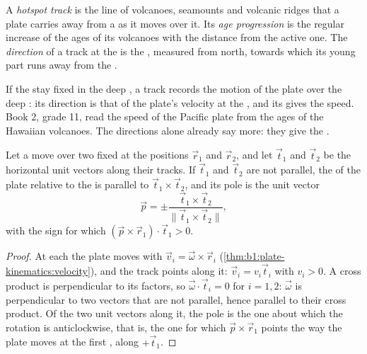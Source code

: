 \begin{definition}\label{def:b1:hotspots:track}
A \emph{hotspot track} is the line of volcanoes, seamounts
and volcanic ridges that a plate carries away from a  as it moves over
it. Its \emph{age progression} is the regular increase
of the ages of its volcanoes with the distance from the active one. The
\emph{direction} of a track at the  is the , measured from north,
towards which its young part runs away from the .
\end{definition}

If the  stay fixed in the deep , a track records the motion of the
plate over the deep : its direction is that of the plate's velocity at
the , and its  gives the speed. Book 2, grade 11, read the
speed of the Pacific plate from the ages of the Hawaiian volcanoes. The
directions alone already say more: they give the .

\begin{proposition}\label{prop:b1:hotspots:two-tracks}
Let a  move over two fixed  at the positions $\vec r_1$ and
$\vec r_2$, and let $\vec t_1$ and $\vec t_2$ be the horizontal unit vectors
along their tracks. If $\vec t_1$ and $\vec t_2$ are not parallel, the  of the plate relative to the  is parallel to
$\vec t_1\times\vec t_2$, and its pole is the unit vector
\[
  \vec p = \pm\frac{\vec t_1\times\vec t_2}{\lVert\vec t_1\times\vec t_2\rVert},
\]
with the sign for which $(\vec p\times\vec r_1)\cdot\vec t_1 > 0$.
\end{proposition}

\begin{proof}
At each  the plate moves with $\vec v_i = \vec\omega\times\vec r_i$
(\cref{thm:b1:plate-kinematics:velocity}), and the track points along it:
$\vec v_i = v_i\vec t_i$ with $v_i > 0$. A cross product is perpendicular to its
factors, so $\vec\omega\cdot\vec t_i = 0$ for $i = 1, 2$: $\vec\omega$ is
perpendicular to two vectors that are not parallel, hence parallel to their
cross product. Of the two unit vectors along it, the pole is the one about
which the rotation is anticlockwise, that is, the one for which
$\vec p\times\vec r_1$ points the way the plate moves at the first ,
along $+\vec t_1$.
\end{proof}

